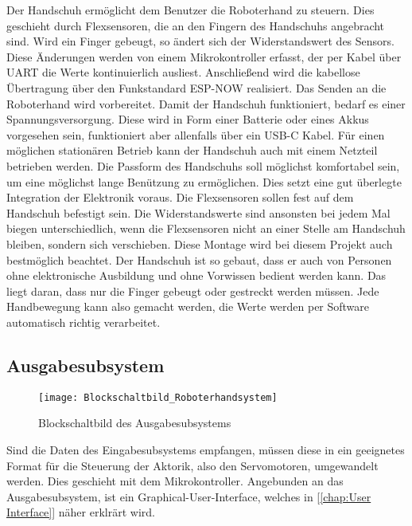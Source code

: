 \documentclass[titlepage,12pt,twoside]{article}
\begin{document}
Der Handschuh ermöglicht dem Benutzer die Roboterhand zu steuern. Dies geschieht 
durch Flexsensoren, die an den Fingern des Handschuhs angebracht sind. Wird ein 
Finger gebeugt, so ändert sich der Widerstandswert des Sensors. Diese Änderungen 
werden von einem Mikrokontroller erfasst, der per Kabel über UART die Werte 
kontinuierlich ausliest. Anschließend wird die kabellose Übertragung über den 
Funkstandard ESP-NOW realisiert. Das Senden an die Roboterhand wird vorbereitet. 
Damit der Handschuh funktioniert, bedarf es einer Spannungsversorgung. Diese wird 
in Form einer Batterie oder eines Akkus vorgesehen sein, funktioniert aber allenfalls 
über ein USB-C Kabel. Für einen möglichen stationären Betrieb kann der Handschuh 
auch mit einem Netzteil betrieben werden. Die Passform des Handschuhs soll 
möglichst komfortabel sein, um eine möglichst lange Benützung zu ermöglichen. 
Dies setzt eine gut überlegte Integration der Elektronik voraus. Die Flexsensoren 
sollen fest auf dem Handschuh befestigt sein. Die Widerstandswerte sind ansonsten 
bei jedem Mal biegen unterschiedlich, wenn die Flexsensoren nicht an einer Stelle 
am Handschuh bleiben, sondern sich verschieben. Diese Montage wird bei diesem 
Projekt auch bestmöglich beachtet. Der Handschuh ist so gebaut, dass er auch von 
Personen ohne elektronische Ausbildung und ohne Vorwissen bedient werden kann. 
Das liegt daran, dass nur die Finger gebeugt oder gestreckt werden müssen. Jede 
Handbewegung kann also gemacht werden, die Werte werden per Software automatisch 
richtig verarbeitet. \\

\subsection{Ausgabesubsystem}
\label{chap:Ausgabesubsystem}

\begin{figure}[H]
	\begin{center}
		\scalebox{0.8}
		{\texttt{[image: Blockschaltbild\_Roboterhandsystem]}}
		\caption{Blockschaltbild des Ausgabesubsystems}
		\label{fig:Blockschaltbild_Roboterhandsystem}		
	\end{center}
\end{figure}
\hfill \break
Sind die Daten des Eingabesubsystems empfangen, müssen diese in ein geeignetes Format für die Steuerung der Aktorik, also den Servomotoren,
umgewandelt werden. Dies geschieht mit dem Mikrokontroller. Angebunden an das Ausgabesubsystem, ist ein Graphical-User-Interface, 
welches in [\textcolor{blue}{\autoref{chap:User Interface}}] näher erklrärt wird. \\
\end{document}
